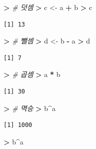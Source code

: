 \documentclass[11pt,a4paper]{book}
\newenvironment{Shaded}{\begin{snugshade}}{\end{snugshade}}
\newcommand{\StringTok}[1]{\textcolor[rgb]{0.31,0.60,0.02}{#1}}
\newcommand{\CommentTok}[1]{\textcolor[rgb]{0.56,0.35,0.01}{\textit{#1}}}
\newcommand{\OperatorTok}[1]{\textcolor[rgb]{0.81,0.36,0.00}{\textbf{#1}}}
\newcommand{\ErrorTok}[1]{\textcolor[rgb]{0.64,0.00,0.00}{\textbf{#1}}}
\newcommand{\NormalTok}[1]{#1}
\theoremstyle{definition}
\theoremstyle{definition}
\theoremstyle{definition}
\theoremstyle{remark}
\begin{document}
\begin{Shaded}
\begin{Highlighting}[]
\OperatorTok{>}\StringTok{ }\CommentTok{# 덧셈}
\ErrorTok{>}\StringTok{ }\NormalTok{c <-}\StringTok{ }\NormalTok{a }\OperatorTok{+}\StringTok{ }\NormalTok{b}
\OperatorTok{>}\StringTok{ }\NormalTok{c}
\end{Highlighting}
\end{Shaded}

\begin{verbatim}
[1] 13
\end{verbatim}

\begin{Shaded}
\begin{Highlighting}[]
\OperatorTok{>}\StringTok{ }\CommentTok{# 뺄셈}
\ErrorTok{>}\StringTok{ }\NormalTok{d <-}\StringTok{ }\NormalTok{b }\OperatorTok{-}\StringTok{ }\NormalTok{a}
\OperatorTok{>}\StringTok{ }\NormalTok{d}
\end{Highlighting}
\end{Shaded}

\begin{verbatim}
[1] 7
\end{verbatim}

\begin{Shaded}
\begin{Highlighting}[]
\OperatorTok{>}\StringTok{ }\CommentTok{# 곱셈}
\ErrorTok{>}\StringTok{ }\NormalTok{a }\OperatorTok{*}\StringTok{ }\NormalTok{b}
\end{Highlighting}
\end{Shaded}

\begin{verbatim}
[1] 30
\end{verbatim}

\begin{Shaded}
\begin{Highlighting}[]
\OperatorTok{>}\StringTok{ }\CommentTok{# 멱승}
\ErrorTok{>}\StringTok{ }\NormalTok{b}\OperatorTok{^}\NormalTok{a}
\end{Highlighting}
\end{Shaded}

\begin{verbatim}
[1] 1000
\end{verbatim}

\begin{Shaded}
\begin{Highlighting}[]
\OperatorTok{>}\StringTok{ }\NormalTok{b}\OperatorTok{^}\NormalTok{a}
\end{Highlighting}
\end{Shaded}
\end{document}
